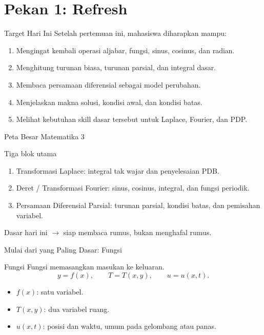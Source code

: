 \documentclass[aspectratio=169,11pt]{beamer}
\begin{document}
\section{Pekan 1: Refresh}

\begin{frame}{Target Hari Ini}
Setelah pertemuan ini, mahasiswa diharapkan mampu:
\begin{enumerate}
  \item Mengingat kembali operasi aljabar, fungsi, sinus, cosinus, dan radian.
  \item Menghitung turunan biasa, turunan parsial, dan integral dasar.
  \item Membaca persamaan diferensial sebagai model perubahan.
  \item Menjelaskan makna solusi, kondisi awal, dan kondisi batas.
  \item Melihat kebutuhan skill dasar tersebut untuk Laplace, Fourier, dan PDP.
\end{enumerate}
\end{frame}

\begin{frame}{Peta Besar Matematika 3}
\begin{block}{Tiga blok utama}
\begin{enumerate}
  \item Transformasi Laplace: integral tak wajar dan penyelesaian PDB.
  \item Deret / Transformasi Fourier: sinus, cosinus, integral, dan fungsi periodik.
  \item Persamaan Diferensial Parsial: turunan parsial, kondisi batas, dan pemisahan variabel.
\end{enumerate}
\end{block}
\vspace{0.2cm}
\begin{center}
Dasar hari ini $\rightarrow$ siap membaca rumus, bukan menghafal rumus.
\end{center}
\end{frame}

\begin{frame}{Mulai dari yang Paling Dasar: Fungsi}
\begin{block}{Fungsi}
Fungsi memasangkan masukan ke keluaran.
\[
 y=f(x), \qquad T=T(x,y), \qquad u=u(x,t).
\]
\end{block}
\begin{itemize}
  \item $f(x)$: satu variabel.
  \item $T(x,y)$: dua variabel ruang.
  \item $u(x,t)$: posisi dan waktu, umum pada gelombang atau panas.
\end{itemize}
\end{frame}
\end{document}
